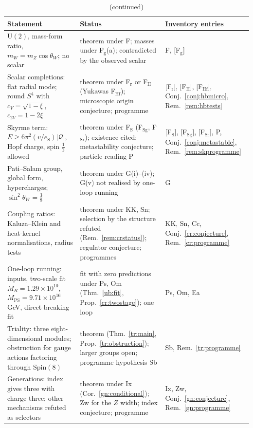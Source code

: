 \documentclass[aps,pra,onecolumn,superscriptaddress,nofootinbib,10pt]{revtex4-2}
\theoremstyle{definition}
\theoremstyle{remark}
\newcommand{\U}{\mathrm{U}}
\begin{document}
\begin{table}[p]
\caption{(continued)}
\footnotesize
\begin{tabular}{@{}p{}p{}p{}@{}}
\toprule
Statement & Status & Inventory entries\\
\midrule
{$\U(2)$, mass-form ratio, $m_W=m_Z\cos\theta_W$; no scalar} & theorem under F; masses under F$_{\mathrm g}$(a); contradicted by the observed scalar & F, [F$_{\mathrm g}$]\\
{Scalar completions: flat radial mode; round $S^4$ with $c_V=\sqrt{1-\xi}$, $c_{2V}=1-2\xi$} & theorem under F$_{\mathrm r}$ or F$_{\mathrm H}$ (Yukawas F$_{\mathrm{Hf}}$); microscopic origin conjecture; programme & [F$_{\mathrm r}$], [F$_{\mathrm H}$], [F$_{\mathrm{Hf}}$], Conj.~\ref{conj:hbmicro}, Rem.~\ref{rem:hbtests}\\
{Skyrme term: $E\ge6\pi^2(v/e_{\mathrm S})\lvert\mathcal Q\rvert$, Hopf charge, spin $\tfrac12$ allowed} & theorem under F$_{\mathrm S}$ (F$_{\mathrm{Sg}}$, F$_{\mathrm{Sr}}$); existence cited; metastability conjecture; particle reading P & [F$_{\mathrm S}$], [F$_{\mathrm{Sg}}$], [F$_{\mathrm{Sr}}$], P, Conj.~\ref{conj:metastable}, Rem.~\ref{rem:skprogramme}\\
{Pati--Salam group, global form, hypercharges; $\sin^2\theta_W=\tfrac38$} & theorem under G(i)--(iv); G(v) not realised by one-loop running & G\\
{Coupling ratios: Kaluza--Klein and heat-kernel normalisations, radius tests} & theorem under KK, Sn; selection by the structure refuted (Rem.~\ref{rem:crstatus}); regulator conjecture; programmes & KK, Sn, Cc, Conj.~\ref{cr:conjecture}, Rem.~\ref{cr:programme}\\
{One-loop running: inputs, two-scale fit $M_R=1.29\times10^{10}$, $M_{\mathrm{PS}}=9.71\times10^{16}$\,GeV, direct-breaking fit} & fit with zero predictions under Ps, Om (Thm.~\ref{ub:fit}, Prop.~\ref{cr:twostage}); one loop & Ps, Om, Ea\\
{Triality: three eight-dimensional modules; obstruction for gauge actions factoring through $\mathrm{Spin}(8)$} & theorem (Thm.~\ref{tr:main}, Prop.~\ref{tr:obstruction}); larger groups open; programme hypothesis Sb & Sb, Rem.~\ref{tr:programme}\\
{Generations: index gives three with charge three; other mechanisms refuted as selectors} & theorem under Ix (Cor.~\ref{gn:conditional}); Zw for the $Z$ width; index conjecture; programme & Ix, Zw, Conj.~\ref{gn:conjecture}, Rem.~\ref{gn:programme}\\

\end{tabular}
\end{table}
\end{document}
